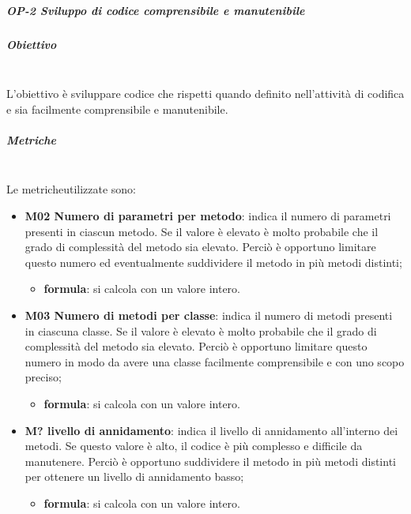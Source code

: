 			\subparagraph{OP-2 Sviluppo di codice comprensibile e manutenibile}
			\subparagraph*{Obiettivo}\mbox{}\\ [1mm]
			L'obiettivo è sviluppare codice che rispetti quando definito nell'attività di codifica e sia facilmente comprensibile e manutenibile.
			\subparagraph*{Metriche}\mbox{}\\ [1mm]
			Le metriche\glosp utilizzate sono:
				\begin{itemize}
					\item \textbf{M02 Numero di parametri per metodo}: indica il numero di parametri presenti in ciascun metodo. Se il valore è elevato è molto probabile che il grado di complessità del metodo sia elevato. Perciò è opportuno limitare questo numero ed eventualmente suddividere il metodo in più metodi distinti;
					\begin{itemize}
						\item[] \textbf{formula}: si calcola con un valore intero.
					\end{itemize}
					\item \textbf{M03 Numero di metodi per classe}: indica il numero di metodi presenti in ciascuna classe. Se il valore è elevato è molto probabile che il grado di complessità del metodo sia elevato. Perciò è opportuno limitare questo numero in modo da avere una classe facilmente comprensibile e con uno scopo preciso;
					\begin{itemize}
						\item[] \textbf{formula}: si calcola con un valore intero.
					\end{itemize}
					\item \textbf{M? livello di annidamento}: indica il livello di annidamento all'interno dei metodi. Se questo valore è alto, il codice è più complesso e difficile da manutenere. Perciò è opportuno suddividere il metodo in più metodi distinti per ottenere un livello di annidamento basso;
					\begin{itemize}
						\item[] \textbf{formula}: si calcola con un valore intero.
					\end{itemize}
				\end{itemize}
		
